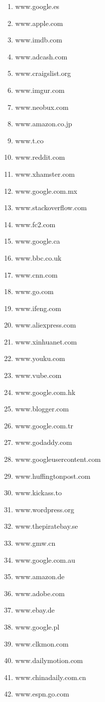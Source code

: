 \begin{enumerate}
\item www.google.es
\item www.apple.com
\item www.imdb.com
\item www.adcash.com
\item www.craigslist.org
\item www.imgur.com
\item www.neobux.com
\item www.amazon.co.jp
\item www.t.co
\item www.reddit.com
\item www.xhamster.com
\item www.google.com.mx
\item www.stackoverflow.com
\item www.fc2.com
\item www.google.ca
\item www.bbc.co.uk
\item www.cnn.com
\item www.go.com
\item www.ifeng.com
\item www.aliexpress.com
\item www.xinhuanet.com
\item www.youku.com
\item www.vube.com
\item www.google.com.hk
\item www.blogger.com
\item www.google.com.tr
\item www.godaddy.com
\item www.googleusercontent.com
\item www.huffingtonpost.com
\item www.kickass.to
\item www.wordpress.org
\item www.thepiratebay.se
\item www.gmw.cn
\item www.google.com.au
\item www.amazon.de
\item www.adobe.com
\item www.ebay.de
\item www.google.pl
\item www.clkmon.com
\item www.dailymotion.com
\item www.chinadaily.com.cn
\item www.espn.go.com

\end{enumerate}
